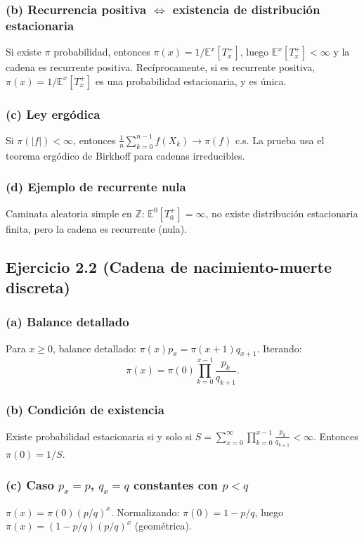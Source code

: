 \documentclass[letterpaper, 12pt]{article}
\newcommand{\E}{\mathbb{E}}
\newcommand{\Z}{\mathbb{Z}}
\newcommand{\1}{\mathbbm{1}}
\begin{document}
    \subsubsection*{(b) Recurrencia positiva $\iff$ existencia de distribuci\'on estacionaria}
    Si existe $\pi$ probabilidad, entonces $\pi(x)=1/\E^x[T_x^+]$, luego $\E^x[T_x^+]<\infty$ y la cadena es recurrente positiva. Rec\'iprocamente, si es recurrente positiva, $\pi(x)=1/\E^x[T_x^+]$ es una probabilidad estacionaria, y es \'unica.

    \subsubsection*{(c) Ley erg\'odica}
    Si $\pi(|f|)<\infty$, entonces $\frac1n\sum_{k=0}^{n-1}f(X_k)\to\pi(f)$ c.s. La prueba usa el teorema erg\'odico de Birkhoff para cadenas irreducibles.

    \subsubsection*{(d) Ejemplo de recurrente nula}
    Caminata aleatoria simple en $\Z$: $\E^0[T_0^+]=\infty$, no existe distribuci\'on estacionaria finita, pero la cadena es recurrente (nula).

    \subsection{Ejercicio 2.2 (Cadena de nacimiento-muerte discreta)}

    \subsubsection*{(a) Balance detallado}
    Para $x\ge0$, balance detallado: $\pi(x)p_x=\pi(x+1)q_{x+1}$. Iterando:
    \[
    \pi(x)=\pi(0)\prod_{k=0}^{x-1}\frac{p_k}{q_{k+1}}.
    \]

    \subsubsection*{(b) Condici\'on de existencia}
    Existe probabilidad estacionaria si y solo si $S=\sum_{x=0}^\infty\prod_{k=0}^{x-1}\frac{p_k}{q_{k+1}}<\infty$. Entonces $\pi(0)=1/S$.

    \subsubsection*{(c) Caso $p_x=p$, $q_x=q$ constantes con $p<q$}
    $\pi(x)=\pi(0)(p/q)^x$. Normalizando: $\pi(0)=1-p/q$, luego $\pi(x)=(1-p/q)(p/q)^x$ (geométrica).
\end{document}
